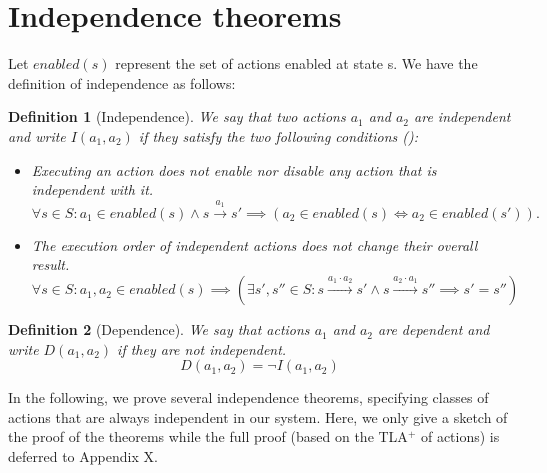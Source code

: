 \documentclass[a4paper,11pt]{article}
\theoremstyle{break}
\newtheorem{definition}{Definition}
\begin{document}
\section{Independence theorems}
 Let $enabled(s)$ represent the set of actions enabled at state s. We have the definition of independence as follows:

\begin{definition}[Independence]\label{def:indep} 
	We say that two actions $a_1$  and $a_2$ are \emph{independent} and write $I(a_1, a_2)$ if they satisfy the two following conditions (\cite{DBLP:books/sp/Godefroid96}):
\begin{itemize}
	\item Executing an action does not enable nor disable any action that is independent with it.
	\begin{equation}\label{eqEnabledness}
	\forall s \in S: a_1 \in enabled(s) \wedge s\xrightarrow{\text{$a_1$}} s' \implies (a_2 \in enabled(s) \Leftrightarrow a_2 \in enabled(s')).
	\end{equation}
	
	\item The execution order of independent actions does not change their overall result.
	\begin{equation}\label{eqCommute}
	\forall s \in S: a_1, a_2 \in enabled(s) \implies (\exists s', s'' \in S:  
	s\xrightarrow{a_1\cdot a_2} s' \wedge s\xrightarrow{a_2\cdot a_1} s'' \implies s' = s'')
	\end{equation}
\end{itemize}
\end{definition}


\begin{definition}[Dependence]
We say that actions $a_1$ and $a_2$ are \emph{dependent} and write $D(a_1, a_2)$ if they are not independent.
\begin{equation}\label{eqDependence}
D(a_1, a_2) = \neg I(a_1, a_2) \end{equation}
\end{definition}

In the following, we prove several independence theorems, specifying classes of actions that are always independent in our system. Here, we only give a sketch of the proof of the theorems while the full proof (based on the TLA$^+$ of actions) is deferred to Appendix X.
\end{document}
